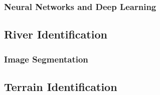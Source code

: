 \subsubsection{Neural Networks and Deep Learning}
\subsection{River Identification}
\subsubsection{Image Segmentation}
\subsection{Terrain Identification}